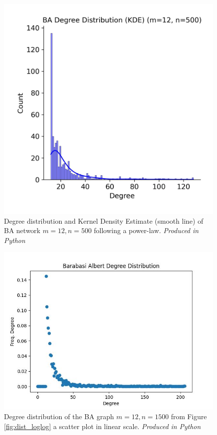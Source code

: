 \documentclass[
	a4paper, %
	10pt, %
	unnumberedsections, %
	twoside, %
]{LTJournalArticle}
\begin{document}
\begin{figure}[H] %
	\includegraphics[width=\linewidth]{Figures/ba/degree_density_500.jpg}
	\caption{Degree distribution and Kernel Density Estimate (smooth line) of BA network \(m=12, n=500\) following a power-law.  \emph{Produced in Python}}
	\label{fig:sf_kde}
\end{figure}

\begin{figure}[H] %
	\includegraphics[width=\linewidth]{Figures/ba/ghetto_degree_dist.jpg}
	\caption{Degree distribution of the BA graph \(m = 12, n = 1500\) from Figure \ref{fig:dist_loglog} a scatter plot in linear scale. \emph{Produced in Python}}
	\label{fig:dist_large}
\end{figure}
\end{document}

